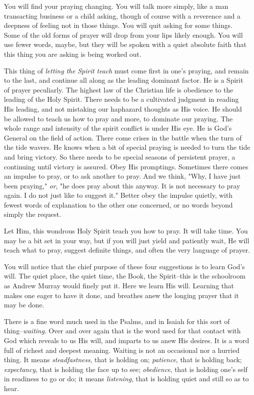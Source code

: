 You will find your praying changing. You will talk more simply, like a man
transacting business or a child asking, though of course with a reverence
and a deepness of feeling not in those things. You will quit asking for
some things. Some of the old forms of prayer will drop from your lips
likely enough. You will use fewer words, maybe, but they will be spoken
with a quiet absolute faith that this thing you are asking is being worked
out.

This thing of \textit{letting the Spirit teach} must come first in one's praying,
and remain to the last, and continue all along as the leading dominant
factor. He is a Spirit of prayer peculiarly. The highest law of the
Christian life is obedience to the leading of the Holy Spirit. There needs
to be a cultivated judgment in reading His leading, and not mistaking our
haphazard thoughts as His voice. He should be allowed to teach us how to
pray and more, to dominate our praying. The whole range and intensity of
the spirit conflict is under His eye. He is God's General on the field of
action. There come crises in the battle when the turn of the tide wavers.
He knows when a bit of special praying is needed to turn the tide and
bring victory. So there needs to be special seasons of persistent prayer,
a continuing until victory is assured. Obey His promptings. Sometimes
there comes an impulse to pray, or to ask another to pray. And we think,
"Why, I have just been praying," \textit{or}, "he does pray about this anyway. It
is not necessary to pray again. I do not just like to suggest it." Better
obey the impulse quietly, with fewest words of explanation to the other
one concerned, or no words beyond simply the request.

Let Him, this wondrous Holy Spirit teach you how to pray. It will take
time. You may be a bit set in your way, but if you will just yield and
patiently wait, He will teach what to pray, suggest definite things, and
often the very language of prayer.

You will notice that the chief purpose of these four suggestions is to
learn God's will. The quiet place, the quiet time, the Book, the
Spirit--this is the schoolroom as Andrew Murray would finely put it. Here
we learn His will. Learning that makes one eager to have it done, and
breathes anew the longing prayer that it may be done.

There is a fine word much used in the Psalms, and in Isaiah for this sort
of thing--\textit{waiting}. Over and over again that is the word used for that
contact with God which reveals to us His will, and imparts to us anew His
desires. It is a word full of richest and deepest meaning. Waiting is not
an occasional nor a hurried thing. It means \textit{steadfastness}, that is
holding on; \textit{patience}, that is holding back; \textit{expectancy}, that is
holding the face up to see; \textit{obedience}, that is holding one's self in
readiness to go or do; it means \textit{listening}, that is holding quiet and
still so as to hear.



